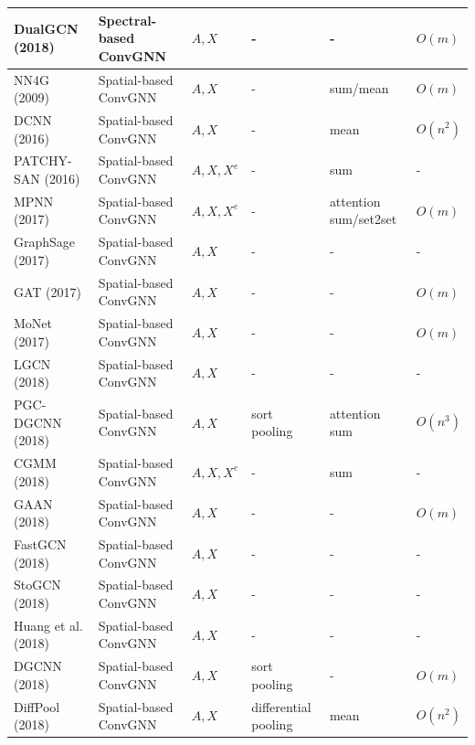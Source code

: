 \begin{table}[]
\begin{tabular}{l l l l l l }
        DualGCN (2018) \cite{zhuang2018dual} & Spectral-based ConvGNN & $A,X$ & - & - & $O(m)$\\ \midrule
        NN4G (2009) \cite{micheli2009neural} & Spatial-based ConvGNN & $A,X$ & - & sum/mean &$O(m)$ \\ \midrule
        DCNN (2016) \cite{atwood2016diffusion} & Spatial-based ConvGNN & $A,X$ & - & mean & $O(n^2)$ \\ \midrule
        PATCHY-SAN (2016) \cite{niepert2016learning} & Spatial-based ConvGNN & $A,X,X^e$  &  - & sum & -\\ \midrule
        MPNN (2017) \cite{gilmer2017neural} & Spatial-based ConvGNN & $A,X,X^e$ & - & attention sum/set2set & $O(m)$ \\ \midrule
        GraphSage (2017) \cite{hamilton2017inductive} & Spatial-based ConvGNN & $A,X$ & - & - & - \\ \midrule
        GAT (2017) \cite{velickovic2017graph} & Spatial-based ConvGNN & $A,X$ & - & - & $O(m)$\\ \midrule
        MoNet (2017) \cite{monti2017geometric} & Spatial-based ConvGNN & $A,X$ & - & - & $O(m)$  \\ \midrule
        LGCN (2018) \cite{gao2018large} & Spatial-based ConvGNN & $A,X$ & - & - & -\\ \midrule
        PGC-DGCNN (2018) \cite{tran2018filter} & Spatial-based ConvGNN & $A,X$ & sort pooling & attention sum & $O(n^3)$ \\ \midrule
        CGMM (2018) \cite{bacciu2018contextual} &Spatial-based ConvGNN & $A,X,X^e$ & - & sum & - \\ \midrule
        GAAN (2018) \cite{zhang2018gaan} & Spatial-based ConvGNN &$A,X$ & - & - & $O(m)$ \\ \midrule
        FastGCN (2018) \cite{chen2018fastgcn} & Spatial-based ConvGNN & $A,X$ & - & - & - \\ \midrule
        StoGCN (2018) \cite{chen2018stochastic} & Spatial-based ConvGNN & $A,X$ & - & - & - \\ \midrule
        Huang et al. (2018) \cite{huang2018ada} & Spatial-based ConvGNN & $A,X$ & - & - & - \\ \midrule
        DGCNN (2018) \cite{zhang2018end} & Spatial-based ConvGNN & $A,X$ & sort pooling &  - & $O(m)$ \\ \midrule
        DiffPool (2018) \cite{ying2018hierarchical}& Spatial-based ConvGNN & $A,X$ & differential pooling & mean & $O(n^2)$ \\ \midrule

\end{tabular}
\end{table}
